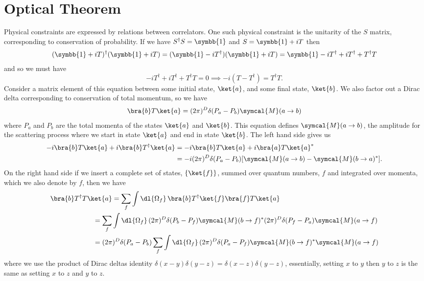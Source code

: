\documentclass[fleqn]{NotesClass}
\newcommand{\hermit}{{\dagger}}
\newcommand{\ident}{\symbb{1}}
\newcommand{\amplitude}{\symcal{M}}
\begin{document}
    \section{Optical Theorem}
    Physical constraints are expressed by relations between correlators.
    One such physical constraint is the unitarity of the \(S\) matrix, corresponding to conservation of probability.
    If we have \(S^\hermit S = \ident\) and \(S = \ident + iT\) then
    \begin{equation}
        (\ident + iT)^\hermit (\ident + iT) = (\ident - iT^\hermit)(\ident + iT) = \ident -iT^\hermit + iT^\hermit + T^\hermit T
    \end{equation}
    and so we must have
    \begin{equation}
        -iT^\hermit + iT^\hermit + T^\hermit T = 0 \implies -i(T - T^\hermit) = T^\hermit T.
    \end{equation}
    Consider a matrix element of this equation between some initial state, \(\ket{a}\), and some final state, \(\ket{b}\).
    We also factor out a Dirac delta corresponding to conservation of total momentum, so we have
    \begin{equation}
        \bra{b} T \ket{a} = (2\pi)^D\delta(P_a - P_b) \amplitude(a \to b)
    \end{equation}
    where \(P_a\) and \(P_b\) are the total momenta of the states \(\ket{a}\) and \(\ket{b}\).
    This equation defines \(\amplitude(a \to b)\), the amplitude for the scattering process where we start in state \(\ket{a}\) and end in state \(\ket{b}\).
    The left hand side gives us
    \begin{align}
        -i\bra{b}T\ket{a} + i\bra{b}T^\hermit\ket{a} &= -i\bra{b}T\ket{a} + i \bra{a}T\ket{a}^*\\
        &= -i(2\pi)^D \delta(P_a - P_b) [\amplitude(a \to b) - \amplitude(b \to a)^*].
    \end{align}
    On the right hand side if we insert a complete set of states, \(\{\ket{f}\}\), summed over quantum numbers, \(f\) and integrated over momenta, which we also denote by \(f\), then we have
    \begin{align}
        \bra{b}T^\hermit T\ket{a} &= \sum_{f} \int \dl{\Omega_f} \, \bra{b}T^\hermit\ket{f} \bra{f} T\ket{a}\\
        &\mkern-50mu= \sum_{f} \int \dl{\Omega_f} \, (2\pi)^D\delta(P_b - P_f) \amplitude(b \to f)^* (2\pi)^D \delta(P_f - P_a) \amplitude(a \to f) \notag\\
        &\mkern-50mu= (2\pi)^D \delta(P_a - P_b) \sum_f \int \dl{\Omega_f} \, (2\pi)^D \delta(P_a - P_f) \amplitude(b \to f)^* \amplitude(a \to f) \notag
    \end{align}
    where we use the product of Dirac deltas identity \(\delta(x - y)\delta(y - z) = \delta(x - z) \delta(y - z)\), essentially, setting \(x\) to \(y\) then \(y\) to \(z\) is the same as setting \(x\) to \(z\) and \(y\) to \(z\).
    
\end{document}

